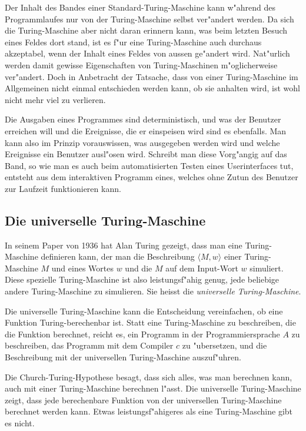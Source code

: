 Der Inhalt des Bandes einer Standard-Turing-Maschine kann w"ahrend des
Programmlaufes nur von der Turing-Maschine selbst ver"andert werden.
Da sich die Turing-Maschine aber nicht daran erinnern kann, was beim
letzten Besuch eines Feldes dort stand, ist es f"ur eine Turing-Maschine
auch durchaus akzeptabel, wenn der Inhalt eines Feldes von aussen
ge"andert wird. Nat"urlich werden damit gewisse Eigenschaften von
Turing-Maschinen m"oglicherweise ver"andert. Doch in Anbetracht der
Tatsache, dass von einer Turing-Maschine im Allgemeinen nicht einmal
entschieden werden kann, ob sie anhalten wird, ist wohl nicht mehr
viel zu verlieren.

Die Ausgaben eines Programmes sind deterministisch, und was der Benutzer
erreichen will und die Ereignisse, die er einspeisen wird sind es ebenfalls.
Man kann also im Prinzip vorauswissen, was ausgegeben werden wird
und welche Ereignisse ein Benutzer ausl"osen wird. Schreibt man diese
Vorg"angig auf das Band, so wie man es auch beim automatisierten Testen
eines Userinterfaces tut, entsteht aus dem interaktiven Programm eines,
welches ohne Zutun des Benutzer zur Laufzeit funktionieren kann.

\subsection{Die universelle Turing-Maschine}
In seinem Paper von 1936 hat Alan Turing gezeigt, dass man eine
Turing-Maschine definieren kann,
der man die Beschreibung
$\langle M,w\rangle$
einer Turing-Maschine $M$ und eines Wortes $w$
und die $M$ auf dem Input-Wort $w$ simuliert.
Diese spezielle Turing-Maschine ist also leistungsf"ahig genug, jede
beliebige andere Turing-Maschine zu simulieren. Sie heisst die {\em universelle
Turing-Maschine}.

Die universelle Turing-Maschine kann die Entscheidung vereinfachen,
ob eine Funktion Turing-berechenbar ist. Statt eine Turing-Maschine
zu beschreiben, die die Funktion berechnet, reicht es, ein Programm
in der Programmiersprache $A$ zu beschreiben, das Programm mit dem
Compiler $c$ zu "ubersetzen, und die Beschreibung mit der universellen
Turing-Maschine auszuf"uhren.

Die Church-Turing-Hypothese besagt, dass sich alles, was man berechnen
kann, auch mit einer Turing-Maschine berechnen l"asst. Die universelle
Turing-Maschine zeigt, dass jede berechenbare Funktion von der
universellen Turing-Maschine berechnet werden kann.
Etwas leistungsf"ahigeres als eine Turing-Maschine gibt es nicht.

